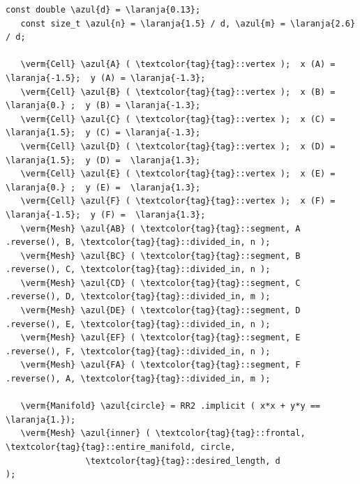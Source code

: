 \begin{Verbatim}[commandchars=\\\{\},formatcom=\small\tt,frame=single,
   label=parag-\ref{\numb section 7.\numb parag 22}.cpp,rulecolor=\color{moldura},
   baselinestretch=0.94,framesep=2mm                                             ]
   const double \azul{d} = \laranja{0.13};
   const size_t \azul{n} = \laranja{1.5} / d, \azul{m} = \laranja{2.6} / d;

   \verm{Cell} \azul{A} ( \textcolor{tag}{tag}::vertex );  x (A) = \laranja{-1.5};  y (A) = \laranja{-1.3};
   \verm{Cell} \azul{B} ( \textcolor{tag}{tag}::vertex );  x (B) =  \laranja{0.} ;  y (B) = \laranja{-1.3};
   \verm{Cell} \azul{C} ( \textcolor{tag}{tag}::vertex );  x (C) =  \laranja{1.5};  y (C) = \laranja{-1.3};
   \verm{Cell} \azul{D} ( \textcolor{tag}{tag}::vertex );  x (D) =  \laranja{1.5};  y (D) =  \laranja{1.3};
   \verm{Cell} \azul{E} ( \textcolor{tag}{tag}::vertex );  x (E) =  \laranja{0.} ;  y (E) =  \laranja{1.3};
   \verm{Cell} \azul{F} ( \textcolor{tag}{tag}::vertex );  x (F) = \laranja{-1.5};  y (F) =  \laranja{1.3};
   \verm{Mesh} \azul{AB} ( \textcolor{tag}{tag}::segment, A .reverse(), B, \textcolor{tag}{tag}::divided_in, n );
   \verm{Mesh} \azul{BC} ( \textcolor{tag}{tag}::segment, B .reverse(), C, \textcolor{tag}{tag}::divided_in, n );
   \verm{Mesh} \azul{CD} ( \textcolor{tag}{tag}::segment, C .reverse(), D, \textcolor{tag}{tag}::divided_in, m );
   \verm{Mesh} \azul{DE} ( \textcolor{tag}{tag}::segment, D .reverse(), E, \textcolor{tag}{tag}::divided_in, n );
   \verm{Mesh} \azul{EF} ( \textcolor{tag}{tag}::segment, E .reverse(), F, \textcolor{tag}{tag}::divided_in, n );
   \verm{Mesh} \azul{FA} ( \textcolor{tag}{tag}::segment, F .reverse(), A, \textcolor{tag}{tag}::divided_in, m );

   \verm{Manifold} \azul{circle} = RR2 .implicit ( x*x + y*y == \laranja{1.});
   \verm{Mesh} \azul{inner} ( \textcolor{tag}{tag}::frontal, \textcolor{tag}{tag}::entire_manifold, circle,
                \textcolor{tag}{tag}::desired_length, d                     );
\end{Verbatim}


